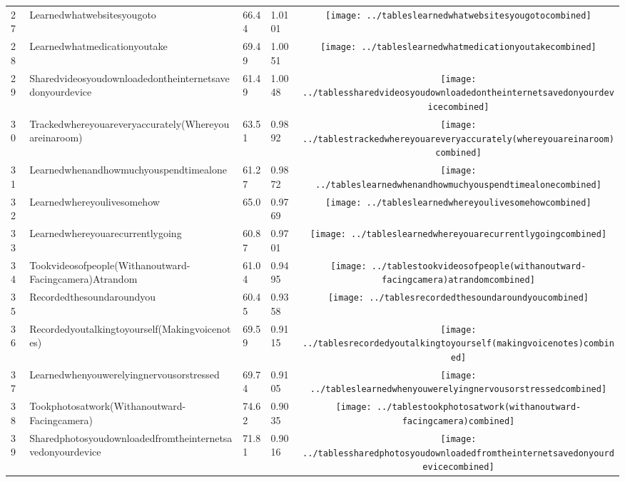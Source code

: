 \documentclass[a4paper,12pt]{article}
\begin{document}
\begin{longtable}{| p{0.5cm} | p{7cm} | p{1cm} |p{1cm} | c |}
27 & Learnedwhatwebsitesyougoto & 66.44 & 1.0101&\texttt{[image: ../tableslearnedwhatwebsitesyougotocombined]} \\ 
28 & Learnedwhatmedicationyoutake & 69.49 & 1.0051&\texttt{[image: ../tableslearnedwhatmedicationyoutakecombined]} \\ 
29 & Sharedvideosyoudownloadedontheinternetsavedonyourdevice & 61.49 & 1.0048&\texttt{[image: ../tablessharedvideosyoudownloadedontheinternetsavedonyourdevicecombined]} \\ 
30 & Trackedwhereyouareveryaccurately(Whereyouareinaroom) & 63.51 & 0.9892&\texttt{[image: ../tablestrackedwhereyouareveryaccurately(whereyouareinaroom)combined]} \\ 
31 & Learnedwhenandhowmuchyouspendtimealone & 61.27 & 0.9872&\texttt{[image: ../tableslearnedwhenandhowmuchyouspendtimealonecombined]} \\ 
32 & Learnedwhereyoulivesomehow & 65.0 & 0.9769&\texttt{[image: ../tableslearnedwhereyoulivesomehowcombined]} \\ 
33 & Learnedwhereyouarecurrentlygoing & 60.87 & 0.9701&\texttt{[image: ../tableslearnedwhereyouarecurrentlygoingcombined]} \\ 
34 & Tookvideosofpeople(Withanoutward-Facingcamera)Atrandom & 61.04 & 0.9495&\texttt{[image: ../tablestookvideosofpeople(withanoutward-facingcamera)atrandomcombined]} \\ 
35 & Recordedthesoundaroundyou & 60.45 & 0.9358&\texttt{[image: ../tablesrecordedthesoundaroundyoucombined]} \\ 
36 & Recordedyoutalkingtoyourself(Makingvoicenotes) & 69.59 & 0.9115&\texttt{[image: ../tablesrecordedyoutalkingtoyourself(makingvoicenotes)combined]} \\ 
37 & Learnedwhenyouwerelyingnervousorstressed & 69.74 & 0.9105&\texttt{[image: ../tableslearnedwhenyouwerelyingnervousorstressedcombined]} \\ 
38 & Tookphotosatwork(Withanoutward-Facingcamera) & 74.62 & 0.9035&\texttt{[image: ../tablestookphotosatwork(withanoutward-facingcamera)combined]} \\ 
39 & Sharedphotosyoudownloadedfromtheinternetsavedonyourdevice & 71.81 & 0.9016&\texttt{[image: ../tablessharedphotosyoudownloadedfromtheinternetsavedonyourdevicecombined]} \\ 

\end{longtable}
\end{document}
